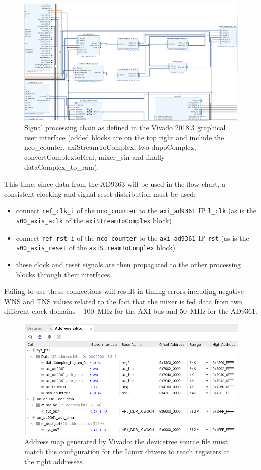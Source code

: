 \documentclass{article}
\begin{document}
\begin{figure}[h!tb]
\includegraphics[width=\linewidth]{2.png}
\caption{Signal processing chain as defined in the Vivado 2018.3 graphical user
interface (added blocks are on the top right and include the nco\_counter, 
axiStreamToComplex, two duppComplex, convertComplextoReal, mixer\_sin and 
finally dataComplex\_to\_ram).}
\label{chain1}
\end{figure}

This time, since data from the AD9363 will be used in the flow chart, a consistent
clocking and signal reset distribution must be used:
\begin{itemize}
\item connect {\tt ref\_clk\_i} of the {\tt nco\_counter} to the {\tt axi\_ad9361} IP
{\tt l\_clk} (as is the {\tt s00\_axis\_aclk} of the {\tt axiStreamToComplex} block)
\item connect {\tt ref\_rst\_i} of the {\tt nco\_counter} to the {\tt axi\_ad9361} IP
{\tt rst} (as is the {\tt s00\_axis\_reset} of the {\tt axiStreamToComplex} block)
\item these clock and reset signals are then propagated to the other processing blocks through
their interfaces.
\end{itemize}

Failing to use these connections will result in timing errors including negative WNS and TNS
values related to the fact that the mixer is fed data from two different clock domains -- 100~MHz
for the AXI bus and 50~MHz for the AD9361.

\begin{figure}[h!tb]
\includegraphics[width=\linewidth]{address.png}
\caption{Address map generated by Vivado: the devicetree source file must match
this configuration for the Linux drivers to reach registers at the right addresses.}
\label{chain2}
\end{figure}
\end{document}
